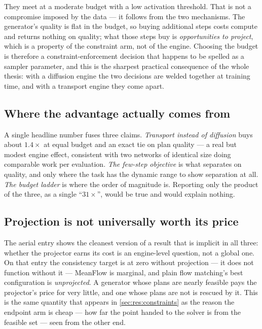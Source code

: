 They meet at a moderate budget with a low activation threshold. That is not a compromise imposed by
the data --- it follows from the two mechanisms. The generator's quality is flat in the budget, so
buying additional steps costs compute and returns nothing on quality; what those steps buy is
\emph{opportunities to project}, which is a property of the constraint arm, not of the engine.
Choosing the budget is therefore a constraint-enforcement decision that happens to be spelled as a
sampler parameter, and this is the sharpest practical consequence of the whole thesis: with a
diffusion engine the two decisions are welded together at training time, and with a transport engine
they come apart.

\subsection*{Where the advantage actually comes from}

A single headline number fuses three claims. \emph{Transport
instead of diffusion} buys about $1.4\times$ at equal budget and an exact tie on plan quality --- a
real but modest engine effect, consistent with two networks of identical size doing comparable work
per evaluation. \emph{The few-step objective} is what separates on quality, and only where the task
has the dynamic range to show separation at all. \emph{The budget ladder} is where the order of
magnitude is. Reporting only the product of the three, as a single ``$31\times$'', would be true and
would explain nothing.

\subsection*{Projection is not universally worth its price}

The aerial entry shows the cleanest version of a result that is implicit in all three: whether the
projector earns its cost is an engine-level question, not a global one. On that entry the
consistency target is at zero without projection --- it does not function without it ---
MeanFlow is marginal, and plain flow matching's best configuration is \emph{unprojected}. A
generator whose plans are nearly feasible pays the projector's price for very little, and one whose
plans are not is rescued by it. This is the same quantity that appears in
\autoref{sec:res:constraints} as the reason the endpoint arm is cheap --- how far the point handed
to the solver is from the feasible set --- seen from the other end.

